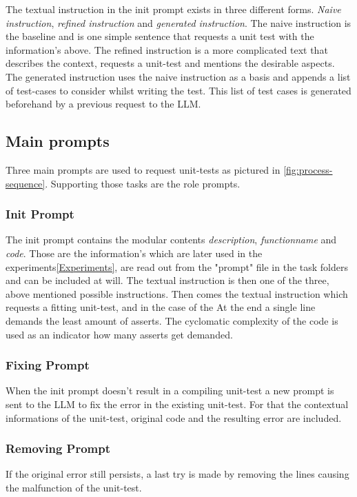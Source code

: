 \documentclass[a4paper,11pt,oneside]{memoir}
\begin{document}
The textual instruction in the init prompt exists in three different forms. \textit{Naive instruction}, \textit{refined instruction} and \textit{generated instruction}. The naive instruction is the baseline and is one simple sentence that requests a unit test with the information's above. The refined instruction is a more complicated text that describes the context, requests a unit-test and mentions the desirable aspects.
The generated instruction uses the naive instruction as a basis and appends a list of test-cases to consider whilst writing the test. This list of test cases is generated beforehand by a previous request to the LLM.

\subsection{Main prompts}
Three main prompts are used to request unit-tests as pictured in \ref{fig:process-sequence}. Supporting those tasks are the role prompts.

\subsubsection{Init Prompt}
The init prompt contains the modular contents \textit{description}, \textit{functionname} and \textit{code}. Those are the information's which are later used in the experiments\ref{Experiments}, are read out from the "prompt" file in the task folders and can be included at will.
The textual instruction is then one of the three, above mentioned possible instructions. Then comes the textual instruction which requests a fitting unit-test, and in the case of the
At the end a single line demands the least amount of asserts. The cyclomatic complexity of the code is used as an indicator how many asserts get demanded. 

\subsubsection{Fixing Prompt}
When the init prompt doesn't result in a compiling unit-test a new prompt is sent to the LLM to fix the error in the existing unit-test. For that the contextual informations of the unit-test, original code and the resulting error are included. 

\subsubsection{Removing Prompt}
If the original error still persists, a last try is made by removing the lines causing the malfunction of the unit-test. 
\end{document}
